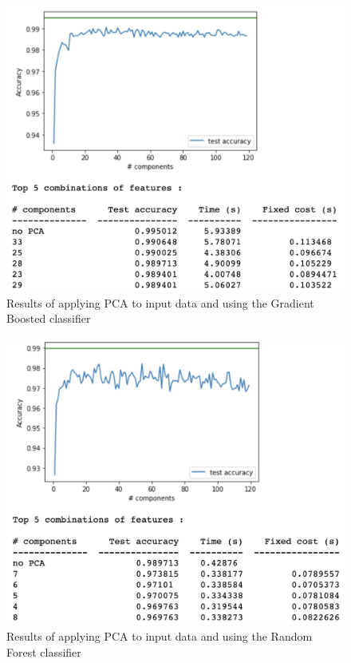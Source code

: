 \begin{appendix}
    \begin{figure}[!ht]
    \centering
      \includegraphics[width=0.68\linewidth]{Figures/gradientboosted_pca.png}
      \captionsetup{justification=centering}
      \caption{Results of applying PCA to input data and using the Gradient Boosted classifier}
      \label{fig:gradientboosted_pca}
    \end{figure}
    
    \begin{figure}[!ht]
    \centering
      \includegraphics[width=0.68\linewidth]{Figures/randomforest_pca.png}
      \captionsetup{justification=centering}
      \caption{Results of applying PCA to input data and using the Random Forest classifier}
      \label{fig:randomforest_pca}
    \end{figure}
    

\end{appendix}
